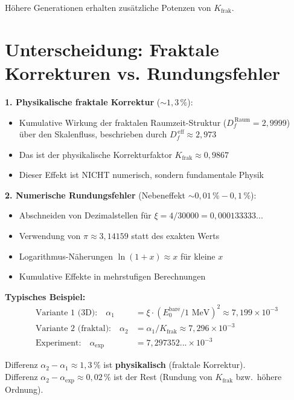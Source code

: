 	Höhere Generationen erhalten zusätzliche Potenzen von $K_{\text{frak}}$.
	
	\section{Unterscheidung: Fraktale Korrekturen vs. Rundungsfehler}
	
	\begin{tcolorbox}[colback=green!5!white,colframe=green!75!black,title={Zwei Arten von Korrekturen in T0-Berechnungen}]
		\textbf{1. Physikalische fraktale Korrektur} ($\sim 1{,}3\,\%$):
		\begin{itemize}
			\item Kumulative Wirkung der fraktalen Raumzeit-Struktur ($D_f^{\,\text{Raum}} = 2{,}9999$) über den Skalenfluss, beschrieben durch $D_f^{\,\text{eff}} \approx 2{,}973$
			\item Das ist der physikalische Korrekturfaktor $K_{\text{frak}} \approx 0{,}9867$
			\item Dieser Effekt ist NICHT numerisch, sondern fundamentale Physik
		\end{itemize}
		
		\textbf{2. Numerische Rundungsfehler} (Nebeneffekt $\sim 0{,}01\,\% - 0{,}1\,\%$):
		\begin{itemize}
			\item Abschneiden von Dezimalstellen für $\xi = 4/30000 = 0{,}000133333...$
			\item Verwendung von $\pi \approx 3{,}14159$ statt des exakten Werts
			\item Logarithmus-Näherungen $\ln(1+x) \approx x$ für kleine $x$
			\item Kumulative Effekte in mehrstufigen Berechnungen
		\end{itemize}
		
		\textbf{Typisches Beispiel:}
		\begin{align}
			\text{Variante 1 (3D):} \quad \alpha_1 &= \xi \cdot (E_0^{\text{bare}}/1\text{ MeV})^2 \approx 7{,}199 \times 10^{-3} \\
			\text{Variante 2 (fraktal):} \quad \alpha_2 &= \alpha_1 / K_{\text{frak}} \approx 7{,}296 \times 10^{-3} \\
			\text{Experiment:} \quad \alpha_{\text{exp}} &= 7{,}297352... \times 10^{-3}
		\end{align}
		
		Differenz $\alpha_2 - \alpha_1 \approx 1{,}3\,\%$ ist \textbf{physikalisch} (fraktale Korrektur).\\
		Differenz $\alpha_2 - \alpha_{\text{exp}} \approx 0{,}02\,\%$ ist der Rest (Rundung von $K_{\text{frak}}$ bzw.\ höhere Ordnung).
	\end{tcolorbox}
	
